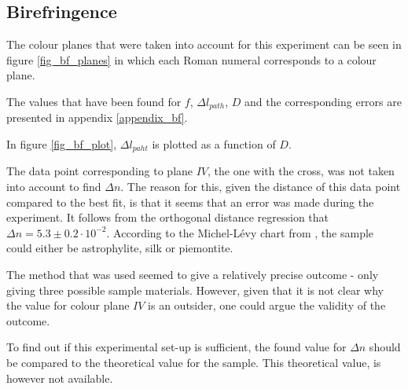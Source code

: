 \subsection{Birefringence}

The colour planes that were taken into account for this experiment can be seen in figure \ref{fig_bf_planes} in which each Roman numeral corresponds to a colour plane.

The values that have been found for $f$, $\Delta l_{path}$, $D$ and the corresponding errors are presented in appendix \ref{appendix_bf}.

In figure \ref{fig_bf_plot}, $\Delta l_{paht}$ is plotted as a function of $D$.

The data point corresponding to plane $IV$, the one with the cross, was not taken into account to find $\Delta n$. The reason for this, given the distance of this data point compared to the best fit, is that it seems that an error was made during the experiment.
It follows from the orthogonal distance regression that $\Delta n = 5.3 \pm 0.2 \cdot 10^{-2}$. According to the Michel-L\'evy chart from \cite{bf_chart}, the sample could either be astrophylite, silk or piemontite.

The method that was used seemed to give a relatively precise outcome - only giving three possible sample materials. However, given that it is not clear why the value for colour plane $IV$ is an outsider, one could argue the validity of the outcome.

To find out if this experimental set-up is sufficient, the found value for $\Delta n$ should be compared to the theoretical value for the sample. This theoretical value, is however not available.


